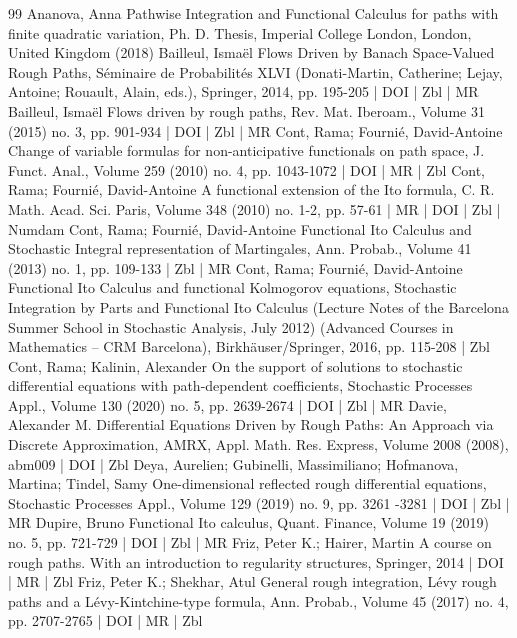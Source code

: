 \documentclass[10pt]{amsart}
\theoremstyle{definition}\newtheorem{defi}[theo]{Definition}\newtheorem{rema}[theo]{Remark}\newtheorem{exam}[theo]{Example}\newtheorem{exem}[theo]{Example}\newtheorem{nota}[theo]{Notation}
\begin{document}


\begin{thebibliography}{99}
Ananova, Anna Pathwise Integration and Functional Calculus for paths with finite quadratic variation, Ph. D. Thesis, Imperial College London, London, United Kingdom (2018)
Bailleul, Ismaël Flows Driven by Banach Space-Valued Rough Paths, Séminaire de Probabilités XLVI (Donati-Martin, Catherine; Lejay, Antoine; Rouault, Alain, eds.), Springer, 2014, pp. 195-205 | DOI | Zbl | MR
Bailleul, Ismaël Flows driven by rough paths, Rev. Mat. Iberoam., Volume 31 (2015) no. 3, pp. 901-934 | DOI | Zbl | MR
Cont, Rama; Fournié, David-Antoine Change of variable formulas for non-anticipative functionals on path space, J. Funct. Anal., Volume 259 (2010) no. 4, pp. 1043-1072 | DOI | MR | Zbl
Cont, Rama; Fournié, David-Antoine A functional extension of the Ito formula, C. R. Math. Acad. Sci. Paris, Volume 348 (2010) no. 1-2, pp. 57-61 | MR | DOI | Zbl | Numdam
Cont, Rama; Fournié, David-Antoine Functional Ito Calculus and Stochastic Integral representation of Martingales, Ann. Probab., Volume 41 (2013) no. 1, pp. 109-133 | Zbl | MR
Cont, Rama; Fournié, David-Antoine Functional Ito Calculus and functional Kolmogorov equations, Stochastic Integration by Parts and Functional Ito Calculus (Lecture Notes of the Barcelona Summer School in Stochastic Analysis, July 2012) (Advanced Courses in Mathematics – CRM Barcelona), Birkhäuser/Springer, 2016, pp. 115-208 | Zbl
Cont, Rama; Kalinin, Alexander On the support of solutions to stochastic differential equations with path-dependent coefficients, Stochastic Processes Appl., Volume 130 (2020) no. 5, pp. 2639-2674 | DOI | Zbl | MR
Davie, Alexander M. Differential Equations Driven by Rough Paths: An Approach via Discrete Approximation, AMRX, Appl. Math. Res. Express, Volume 2008 (2008), abm009 | DOI | Zbl
Deya, Aurelien; Gubinelli, Massimiliano; Hofmanova, Martina; Tindel, Samy One-dimensional reflected rough differential equations, Stochastic Processes Appl., Volume 129 (2019) no. 9, pp. 3261 -3281 | DOI | Zbl | MR
Dupire, Bruno Functional Ito calculus, Quant. Finance, Volume 19 (2019) no. 5, pp. 721-729 | DOI | Zbl | MR
Friz, Peter K.; Hairer, Martin A course on rough paths. With an introduction to regularity structures, Springer, 2014 | DOI | MR | Zbl
Friz, Peter K.; Shekhar, Atul General rough integration, Lévy rough paths and a Lévy-Kintchine-type formula, Ann. Probab., Volume 45 (2017) no. 4, pp. 2707-2765 | DOI | MR | Zbl

\end{thebibliography}
\end{document}
